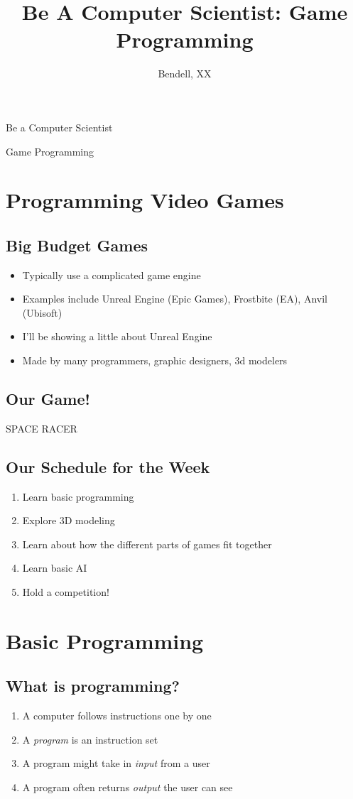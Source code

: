 \documentclass[
paper=128mm:96mm,
fontsize=12pt,
pagesize,
parskip=half-,
]{scrartcl}
\title{Be A Computer Scientist: Game Programming}
\author{Bendell, XX}
\date{}
\newcommand{\slide}[1]{#1 \clearpage}
\newcommand{\sectionslide}[1]{\slide{\hfill \vfill \section{#1} \vspace{5em}}}
\newcommand{\subsectionslide}[2]{\vspace*{1em}\slide{\subsection{#1} #2}}
\renewcommand\maketitle
{
	\vspace*{3ex}
	\begin{center}
		{\Huge Be a Computer Scientist \vspace*{.3em} \par}
		{\large Game Programming \par}
		\vspace*{2em}
	\end{center}
}
\begin{document}
	
	
	\slide
	{
		\maketitle	
	}
	
	\sectionslide{Programming Video Games}

	\subsectionslide{Big Budget Games}
	{
		\begin{itemize}
			\item Typically use a complicated game engine
			\item Examples include Unreal Engine (Epic Games), Frostbite (EA), Anvil (Ubisoft)
			\item I'll be showing a little about Unreal Engine
			\item Made by many programmers, graphic designers, 3d modelers
		\end{itemize}	
	}
	
	\subsectionslide{Our Game!}
	{	
		\vspace{4em}
		\begin{center}
			\begin{huge}
				SPACE RACER
			\end{huge}
		\end{center}
	}
	
	\subsectionslide{Our Schedule for the Week}
	{
		\begin{enumerate}
			\item Learn basic programming
			\item Explore 3D modeling
			\item Learn about how the different parts of games fit together
			\item Learn basic AI
			\item Hold a competition!
		\end{enumerate}
	}
	
	\sectionslide{Basic Programming}
	
	\subsectionslide{What is programming?}
	{
		\begin{enumerate}
			\item A computer follows instructions one by one
			\item A \textit{program} is an instruction set
			\item A program might take in \textit{input} from a user
			\item A program often returns \textit{output} the user can see
		\end{enumerate}	
	}
	
\end{document}
